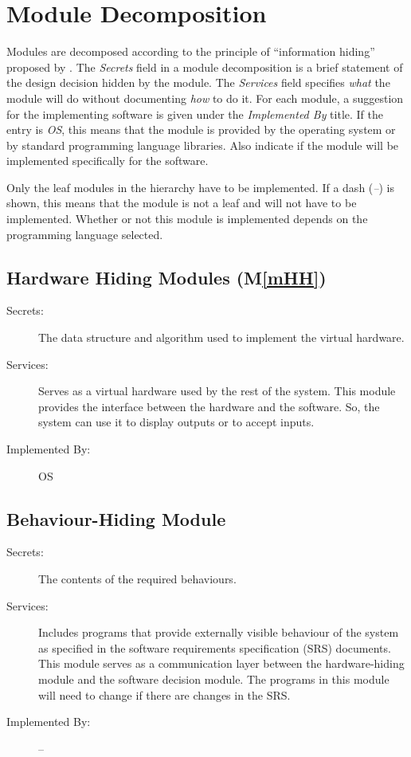 \documentclass[12pt, titlepage]{article}
\newcommand{\mref}[1]{M\ref{#1}}
\begin{document}
\section{Module Decomposition} \label{SecMD}

Modules are decomposed according to the principle of ``information hiding''
proposed by \cite{parnas_modular_1985}. The \emph{Secrets} field in a module
decomposition is a brief statement of the design decision hidden by the
module. The \emph{Services} field specifies \emph{what} the module will do
without documenting \emph{how} to do it. For each module, a suggestion for the
implementing software is given under the \emph{Implemented By} title. If the
entry is \emph{OS}, this means that the module is provided by the operating
system or by standard programming language libraries.  Also indicate if the
module will be implemented specifically for the software.

Only the leaf modules in the
hierarchy have to be implemented. If a dash (\emph{--}) is shown, this means
that the module is not a leaf and will not have to be implemented. Whether or
not this module is implemented depends on the programming language
selected.

\subsection{Hardware Hiding Modules (\mref{mHH})}
\label{sssec:HH}
\begin{description}
\item[Secrets:]The data structure and algorithm used to implement the virtual
  hardware.
\item[Services:]Serves as a virtual hardware used by the rest of the
  system. This module provides the interface between the hardware and the
  software. So, the system can use it to display outputs or to accept inputs.
\item[Implemented By:] OS
\end{description}

\subsection{Behaviour-Hiding Module}

\begin{description}
\item[Secrets:]The contents of the required behaviours.
\item[Services:]Includes programs that provide externally visible behaviour of
  the system as specified in the software requirements specification (SRS)
  documents. This module serves as a communication layer between the
  hardware-hiding module and the software decision module. The programs in this
  module will need to change if there are changes in the SRS.
\item[Implemented By:] --
\end{description}
\end{document}
